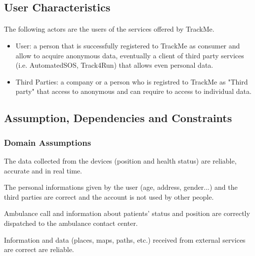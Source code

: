 \documentclass[a4paper]{article}
\begin{document}
    \subsection{User Characteristics}
    
    \paragraph{}The following actors are the users of the services offered by TrackMe. 
    
    
    \begin{itemize}
        \item User:  a person that is successfully registered to TrackMe as consumer and allow to acquire anonymous data, eventually a client of third party services (i.e. AutomatedSOS, Track4Run) that allows even personal data.
        
        \item Third Parties:  a company or a person who is registred to TrackMe as "Third party" that access to anonymous and can require to access to individual data.
        
    \end{itemize}
    
    \subsection{Assumption, Dependencies and Constraints}
    
    \subsubsection{Domain Assumptions}
    
    
    \begin{enumerate}[label={[D.\arabic*]}]
        
        \item The data collected from the devices (position and health status) are reliable, accurate and in real time.
        \item The personal informations given by the user (age, address, gender...) and the third parties are correct and the account is not used by other people. 
        \item Ambulance call and information about patients' status and position are correctly dispatched to the ambulance contact center.
        \item Information and data (places, maps, paths, etc.) received from external services are correct are reliable.
        
    \end{enumerate}
    
\end{document}
